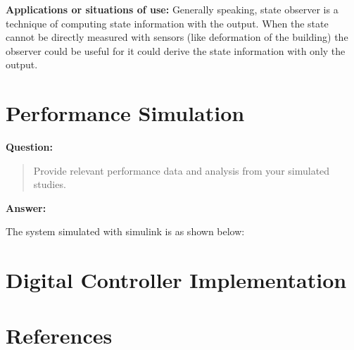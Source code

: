 \documentclass[12pt, oneside]{article}
\begin{document}
\textbf{Applications or situations of use:}
Generally speaking, state observer is a technique of computing state information with the output.
When the state cannot be directly measured with sensors (like deformation of the building) the observer could be useful for it could derive the state information with only the output. 

\section{Performance Simulation}
\textbf{Question:}
\begin{quote}
    Provide relevant performance data and analysis from your simulated studies.
\end{quote}
\textbf{Answer:}

The system simulated with simulink is as shown below:


\label{Performance Simulation}
\section{Digital Controller Implementation}
\section{References}
\end{document}
